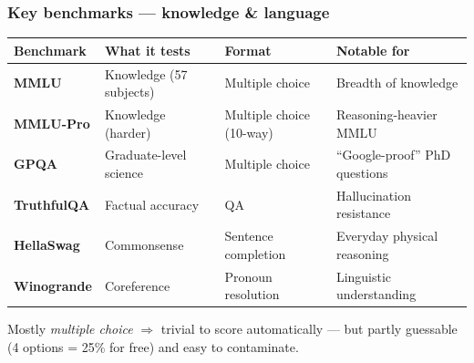 \documentclass[aspectratio=169]{beamer}
\begin{document}
\begin{frame}
\begin{center}
\end{center}
\end{frame}

\begin{frame}
\frametitle{Key benchmarks --- knowledge \& language}
\vspace{-0.1cm}
\renewcommand{\arraystretch}{1.5}
\begin{center}
{\small
\begin{tabular}{>{\bfseries}l l l l}
  \textbf{Benchmark} & \textbf{What it tests} & \textbf{Format} & \textbf{Notable for} \\
  \hline
  \textcolor{popblue}{MMLU} & Knowledge (57 subjects) & Multiple choice & Breadth of knowledge \\
  \textcolor{warnred}{MMLU-Pro} & Knowledge (harder) & Multiple choice (10-way) & Reasoning-heavier MMLU \\
  \textcolor{popblue}{GPQA} & Graduate-level science & Multiple choice & ``Google-proof'' PhD questions \\
  \textcolor{violet1}{TruthfulQA} & Factual accuracy & QA & Hallucination resistance \\
  \textcolor{orange1}{HellaSwag} & Commonsense & Sentence completion & Everyday physical reasoning \\
  \textcolor{paramgreen}{Winogrande} & Coreference & Pronoun resolution & Linguistic understanding \\
  \hline
\end{tabular}
}
\end{center}
\vspace{0.35cm}
\begin{center}
{\small Mostly \emph{multiple choice} $\Rightarrow$ trivial to score automatically --- but partly guessable (4 options = 25\% for free) and easy to contaminate.}
\end{center}
\end{frame}
\end{document}
